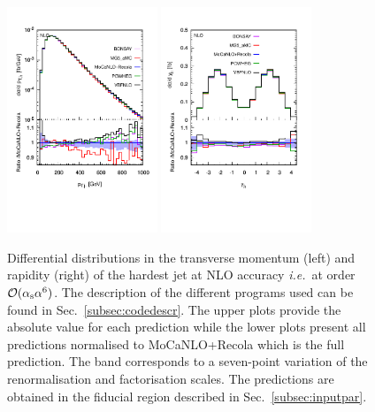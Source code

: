 \documentclass[twocolumn,epjc3]{svjour3} %
\newlength{\width}
\begin{document}
     \begin{figure}
       \centering
       \includegraphics[width=0.4\textwidth,angle=0,clip=true,trim={0.4cm 2cm 0.cm 1.cm}]{figures/NLO/ptj1_NLO.pdf}
       \includegraphics[width=0.4\textwidth,angle=0,clip=true,trim={0.3cm 2cm 0.cm 1.cm}]{figures/NLO/yj1_NLO.pdf}
    \caption{\label{fig:distNLO2} Differential distributions in the transverse momentum (left) and rapidity (right) of the hardest jet at NLO accuracy \emph{i.e.}\ at order $\mathcal{O}(\alpha_{\rm s}\alpha^6)$.
    The description of the different programs used can be found in Sec.~\protect\ref{subsec:codedescr}.
    The upper plots provide the absolute value for each prediction while the lower plots present all predictions normalised to {\sc MoCaNLO}+{\sc Recola} which is the full prediction.
    The band corresponds to a seven-point variation of the renormalisation and factorisation scales.
    The predictions are obtained in the fiducial region described in Sec.~\ref{subsec:inputpar}.
    }
    \end{figure}
\end{document}
